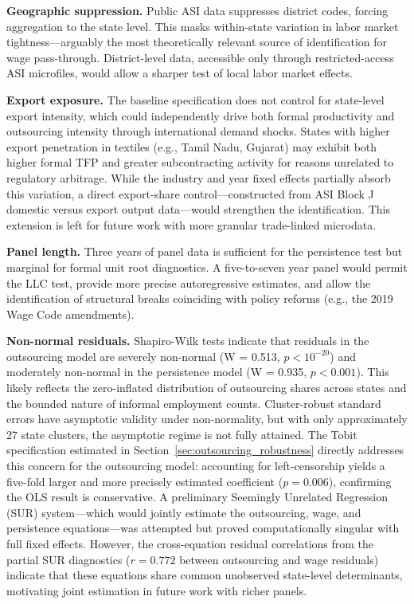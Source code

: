 \textbf{Geographic suppression.} Public ASI data suppresses district codes, forcing aggregation to the state level. This masks within-state variation in labor market tightness—arguably the most theoretically relevant source of identification for wage pass-through. District-level data, accessible only through restricted-access ASI microfiles, would allow a sharper test of local labor market effects.

\textbf{Export exposure.} The baseline specification does not control for state-level export intensity, which could independently drive both formal productivity and outsourcing intensity through international demand shocks. States with higher export penetration in textiles (e.g., Tamil Nadu, Gujarat) may exhibit both higher formal TFP and greater subcontracting activity for reasons unrelated to regulatory arbitrage. While the industry and year fixed effects partially absorb this variation, a direct export-share control---constructed from ASI Block J domestic versus export output data---would strengthen the identification. This extension is left for future work with more granular trade-linked microdata.

\textbf{Panel length.} Three years of panel data is sufficient for the persistence test but marginal for formal unit root diagnostics. A five-to-seven year panel would permit the LLC test, provide more precise autoregressive estimates, and allow the identification of structural breaks coinciding with policy reforms (e.g., the 2019 Wage Code amendments).

\textbf{Non-normal residuals.} Shapiro-Wilk tests indicate that residuals in the outsourcing model are severely non-normal (W = 0.513, $p < 10^{-20}$) and moderately non-normal in the persistence model (W = 0.935, $p < 0.001$). This likely reflects the zero-inflated distribution of outsourcing shares across states and the bounded nature of informal employment counts. Cluster-robust standard errors have asymptotic validity under non-normality, but with only approximately 27 state clusters, the asymptotic regime is not fully attained. The Tobit specification estimated in Section~\ref{sec:outsourcing_robustness} directly addresses this concern for the outsourcing model: accounting for left-censorship yields a five-fold larger and more precisely estimated coefficient ($p = 0.006$), confirming the OLS result is conservative. A preliminary Seemingly Unrelated Regression (SUR) system---which would jointly estimate the outsourcing, wage, and persistence equations---was attempted but proved computationally singular with full fixed effects. However, the cross-equation residual correlations from the partial SUR diagnostics ($r = 0.772$ between outsourcing and wage residuals) indicate that these equations share common unobserved state-level determinants, motivating joint estimation in future work with richer panels.

